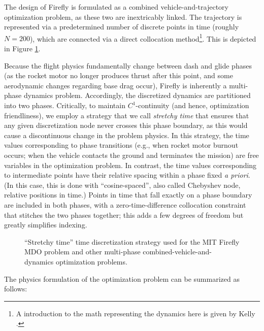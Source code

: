 The design of Firefly is formulated as a combined vehicle-and-trajectory optimization problem, as these two are inextricably linked. The trajectory is represented via a predetermined number of discrete points in time (roughly $N=200$), which are connected via a direct collocation method\footnote{A introduction to the math representing the dynamics here is given by Kelly \cite{kelly_introduction_2017}.}. This is depicted in Figure \ref{fig:firefly_time_discretization}.

Because the flight physics fundamentally change between dash and glide phases (as the rocket motor no longer produces thrust after this point, and some aerodynamic changes regarding base drag occur), Firefly is inherently a multi-phase dynamics problem. Accordingly, the discretized dynamics are partitioned into two phases. Critically, to maintain $C^1$-continuity (and hence, optimization friendliness), we employ a strategy that we call \emph{stretchy time} that ensures that any given discretization node never crosses this phase boundary, as this would cause a discontinuous change in the problem physics. In this strategy, the time values corresponding to phase transitions (e.g., when rocket motor burnout occurs; when the vehicle contacts the ground and terminates the mission) are free variables in the optimization problem. In contrast, the time values corresponding to intermediate points have their relative spacing within a phase fixed \emph{a priori}. (In this case, this is done with ``cosine-spaced'', also called Chebyshev node, relative positions in time.) Points in time that fall exactly on a phase boundary are included in both phases, with a zero-time-difference collocation constraint that stitches the two phases together; this adds a few degrees of freedom but greatly simplifies indexing.

\begin{figure}[H]
    \centering
    
    \caption{``Stretchy time'' time discretization strategy used for the MIT Firefly MDO problem and other multi-phase combined-vehicle-and-dynamics optimization problems.}
    \label{fig:firefly_time_discretization}
\end{figure}

The physics formulation of the optimization problem can be summarized as follows:

